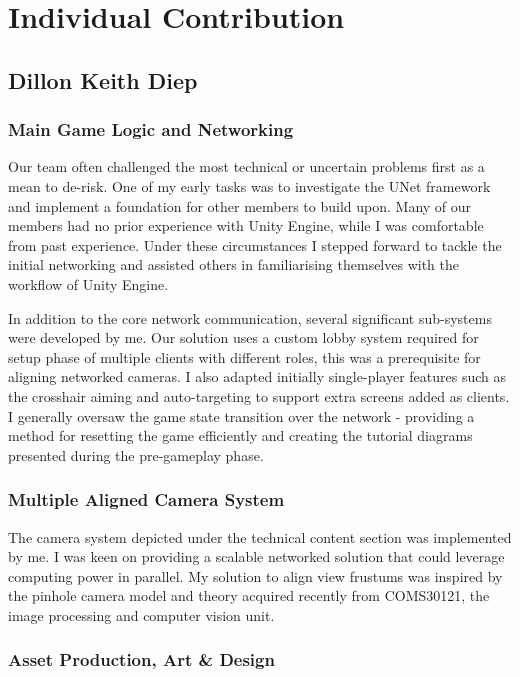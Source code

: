 \documentclass[a4paper,11pt]{article}
\begin{document}
\section{Individual Contribution}

\subsection{Dillon Keith Diep}

\subsubsection{Main Game Logic and Networking}

Our team often challenged the most technical or uncertain problems first as a mean to de-risk. One of my early tasks was to investigate the UNet framework and implement a foundation for other members to build upon. Many of our members had no prior experience with Unity Engine, while I was comfortable from past experience. Under these circumstances I stepped forward to tackle the initial networking and assisted others in familiarising themselves with the workflow of Unity Engine.

In addition to the core network communication, several significant sub-systems were developed by me. Our solution uses a custom lobby system required for setup phase of multiple clients with different roles, this was a prerequisite for aligning networked cameras. I also adapted initially single-player features such as the crosshair aiming and auto-targeting to support extra screens added as clients. I generally oversaw the game state transition over the network - providing a method for resetting the game efficiently and creating the tutorial diagrams presented during the pre-gameplay phase.

\subsubsection{Multiple Aligned Camera System}

The camera system depicted under the technical content section was implemented by me. I was keen on providing a scalable networked solution that could leverage computing power in parallel.  My solution to align view frustums was inspired by the pinhole camera model and theory acquired recently from COMS30121, the image processing and computer vision unit.

\subsubsection{Asset Production, Art \& Design}
\end{document}
